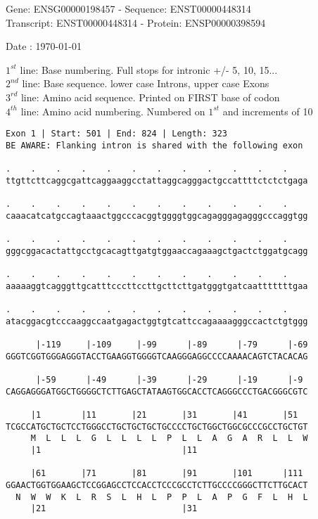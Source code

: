 \documentclass{article}
\begin{document}
\begin{center}
\begin{large}
Gene: ENSG00000198457 - Sequence: ENST00000448314\\
Transcript: ENST00000448314 - Protein: ENSP00000398594
 
 Date : \today
\end{large}
\end{center}
$1^{st}$ line: Base numbering. Full stops for intronic +/- 5, 10, 15...\\
$2^{nd}$ line: Base sequence. lower case Introns, upper case Exons\\
$3^{rd}$ line: Amino acid sequence. Printed on FIRST base of codon\\
$4^{th}$ line: Amino acid numbering. Numbered on $1^{st}$ and increments of 10\\
\begin{Verbatim}[fontfamily=courier]
Exon 1 | Start: 501 | End: 824 | Length: 323
BE AWARE: Flanking intron is shared with the following exon

.    .    .    .    .    .    .    .    .    .    .    .    
ttgttcttcaggcgattcaggaaggcctattaggcagggactgccattttctctctgaga

.    .    .    .    .    .    .    .    .    .    .    .    
caaacatcatgccagtaaactggcccacggtggggtggcagagggagagggcccaggtgg

.    .    .    .    .    .    .    .    .    .    .    .    
gggcggacactattgcctgcacagttgatgtggaaccagaaagctgactctggatgcagg

.    .    .    .    .    .    .    .    .    .    .    .    
aaaaaggtcagggttgcatttcccttccttgcttcttgatgggtgatcaatttttttgaa

.    .    .    .    .    .    .    .    .    .    .    .    
atacggacgtcccaaggccaatgagactggtgtcattccagaaaagggccactctgtggg

      |-119     |-109     |-99      |-89      |-79      |-69
GGGTCGGTGGGAGGGTACCTGAAGGTGGGGTCAAGGGAGGCCCCAAAACAGTCTACACAG

      |-59      |-49      |-39      |-29      |-19      |-9 
CAGGAGGGATGGCTGGGGCTCTTGAGCTATAAGTGGCACCTCAGGGCCCTGACGGGCGTC

     |1        |11       |21       |31       |41       |51  
TCGCCATGCTGCTCCTGGGCCTGCTGCTGCTGCCCCTGCTGGCTGGCGCCCGCCTGCTGT
     M  L  L  L  G  L  L  L  L  P  L  L  A  G  A  R  L  L  W
     |1                            |11                      

     |61       |71       |81       |91       |101      |111 
GGAACTGGTGGAAGCTCCGGAGCCTCCACCTCCCGCCTCTTGCCCCGGGCTTCTTGCACT
  N  W  W  K  L  R  S  L  H  L  P  P  L  A  P  G  F  L  H  L
     |21                           |31                      

\end{Verbatim}
\end{document}
